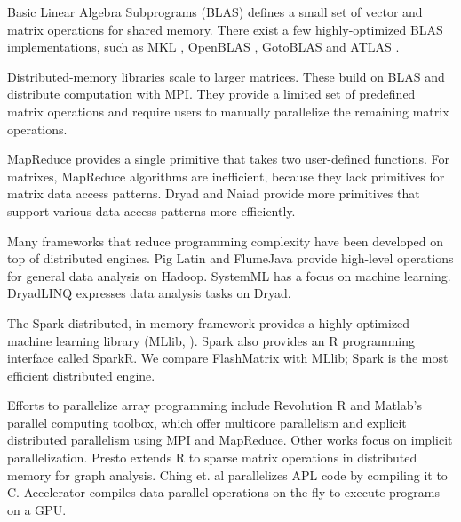 Basic Linear Algebra Subprograms (BLAS) defines a small set of vector and
matrix operations for shared memory. There exist a few
highly-optimized BLAS implementations, such as MKL \cite{mkl}, OpenBLAS
\cite{openblas}, GotoBLAS \cite{Goto} and ATLAS \cite{atlas}. 

Distributed-memory libraries \cite{trilinos, petsc, elemental}
scale to larger matrices. 
These build on BLAS and distribute computation with MPI.
They provide a limited set of predefined matrix operations and
require users to manually parallelize the remaining matrix operations.

MapReduce \cite{mapreduce} 
provides a single primitive that takes two user-defined functions. 
For matrixes, MapReduce algorithms are inefficient, because they lack
primitives for matrix data access patterns.
Dryad \cite{dryad} and Naiad \cite{naiad} provide more primitives 
that support various data access patterns more efficiently.

Many frameworks that reduce programming complexity have been developed on top of distributed engines.
Pig Latin \cite{pig} and FlumeJava \cite{flumejava}
provide high-level operations for general data analysis on Hadoop.
SystemML \cite{systemml} has a focus on machine learning. 
DryadLINQ \cite{dryadlinq} expresses data analysis tasks on Dryad. 

The Spark \cite{spark} distributed, in-memory framework
provides a highly-optimized machine learning library (MLlib, \cite{mllib}).
Spark also provides an R programming interface called SparkR.  
We compare FlashMatrix with MLlib; Spark is the most efficient distributed engine.

Efforts to parallelize array programming include
Revolution R \cite{rre} and Matlab's parallel computing toolbox, which
offer multicore parallelism and explicit distributed parallelism using MPI and MapReduce. 
Other works focus on implicit parallelization.
Presto \cite{presto} extends R to sparse matrix operations in distributed memory for graph
analysis. Ching et. al \cite{Ching12} parallelizes APL code by
compiling it to C. Accelerator \cite{accelerator} compiles
data-parallel operations on the fly to execute programs on a GPU.
